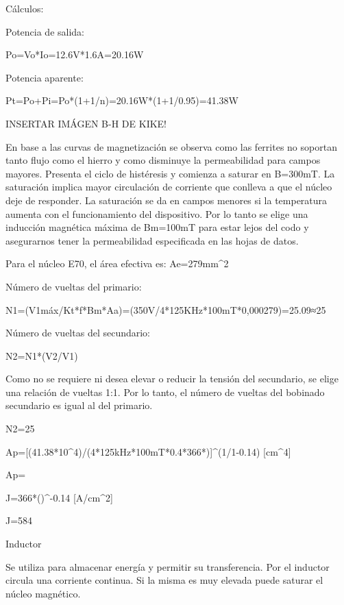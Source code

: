 Cálculos:

Potencia de salida:

Po=Vo*Io=12.6V*1.6A=20.16W

Potencia aparente: 

Pt=Po+Pi=Po*(1+1/n)=20.16W*(1+1/0.95)=41.38W

INSERTAR IMÁGEN B-H DE KIKE!

En base a las curvas de magnetización se observa como las ferrites no soportan tanto flujo como el hierro y como disminuye la permeabilidad para campos mayores.  
Presenta el ciclo de histéresis y comienza a saturar en B=300mT. 
La saturación implica mayor circulación de corriente que conlleva a que el núcleo deje de responder. 
La saturación se da en campos menores si la temperatura aumenta con el funcionamiento del dispositivo. 
Por lo tanto se elige una inducción magnética máxima de Bm=100mT para estar lejos del codo y asegurarnos tener la permeabilidad especificada en las hojas de datos. 

Para el núcleo E70, el área efectiva es: Ae=279mm^2

Número de vueltas del primario:

N1=(V1máx/Kt*f*Bm*Aa)=(350V/4*125KHz*100mT*0,000279)=25.09≈25
 
Número de vueltas del secundario: 

N2=N1*(V2/V1)

Como no se requiere ni desea elevar o reducir la tensión del secundario, se elige una relación de vueltas 1:1. 
Por lo tanto, el número de vueltas del bobinado secundario es igual al del primario. 

N2=25

Ap=[(41.38*10^4)/(4*125kHz*100mT*0.4*366*)]^(1/1-0.14) [cm^4]

Ap= 


J=366*()^-0.14 [A/cm^2]

J=584


Inductor

Se utiliza para almacenar energía y permitir su transferencia. 
Por el inductor circula una corriente continua. Si la misma es muy elevada puede saturar el núcleo magnético. 


